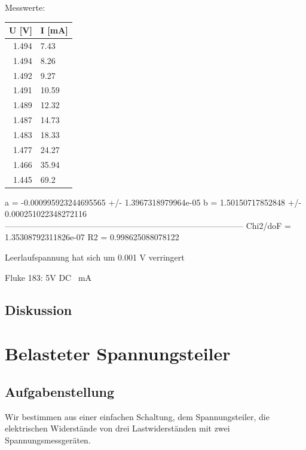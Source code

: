 \documentclass{article}
\begin{document}
Messwerte:
\begin{tabular}{r|l}
\hline
U [V] & I [mA]\\
\hline
1.494 & 7.43\\
1.494 & 8.26\\
1.492 & 9.27\\
1.491 & 10.59\\
1.489 & 12.32\\
1.487 & 14.73\\
1.483 & 18.33\\
1.477 & 24.27\\
1.466 & 35.94\\
1.445 & 69.2\\
\hline
\end{tabular}

a  = -0.000995923244695565 +/- 1.3967318979964e-05
b  = 1.50150717852848 +/- 0.000251022348272116
--------------------------------------------------------------------------------------
Chi2/doF = 1.35308792311826e-07
R2 = 0.998625088078122

Leerlaufspannung hat sich um 0.001 V verringert

Fluke 183:
5V DC
~mA

\subsection{Diskussion}

\section{Belasteter Spannungsteiler}

\subsection{Aufgabenstellung}
Wir bestimmen aus einer einfachen Schaltung, dem Spannungsteiler, die elektrischen Widerstände von drei Lastwiderständen mit zwei Spannungsmessgeräten.
\end{document}
